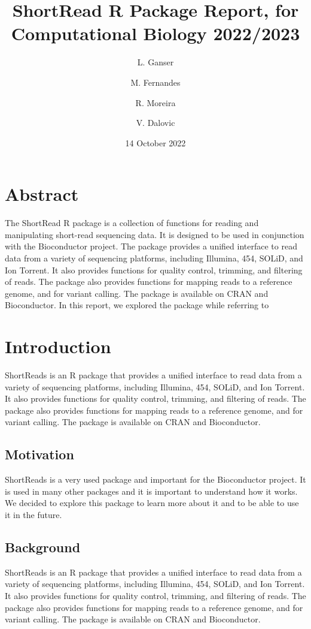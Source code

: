 \documentclass[12pt]{article}
\title{ShortRead R Package Report, for Computational Biology 2022/2023}
\date{14 October 2022}
\author[1]{L. Ganser}
\author[2]{M. Fernandes}
\author[2]{R. Moreira}
\author[2]{V. Dalovic}
\affil[1]{École Polytechnique Fédérale de Lausanne, Switzerland}
\affil[2]{Instituto Superior T\'ecnico, Universidade de Lisboa, Portugal}
\begin{document}
\maketitle


\section{Abstract} 

The ShortRead R package is a collection of functions for reading and manipulating short-read sequencing data. It is designed to be used in conjunction with the Bioconductor project. The package provides a unified interface to read data from a variety of sequencing platforms, including Illumina, 454, SOLiD, and Ion Torrent. It also provides functions for quality control, trimming, and filtering of reads. The package also provides functions for mapping reads to a reference genome, and for variant calling. The package is available on CRAN and Bioconductor.
In this report, we explored the package while referring to %

\section{Introduction}
ShortReads is an R package that provides a unified interface to read data from a variety of sequencing platforms, including 
Illumina, 454, SOLiD, and Ion Torrent. It also provides functions for quality control, trimming, and filtering of reads.
The package also provides functions for mapping reads to a reference genome, and for variant calling. The package is available on CRAN and Bioconductor.


\subsection{Motivation}
ShortReads is a very used package and important for the Bioconductor project. It is used in many other packages and it is important to understand how it works.
We decided to explore this package to learn more about it and to be able to use it in the future.

\subsection{Background}
ShortReads is an R package that provides a unified interface to read data from a variety of sequencing platforms, including Illumina, 454, SOLiD, and Ion Torrent.
It also provides functions for quality control, trimming, and filtering of reads. The package also provides functions for mapping reads to a reference genome, and for variant calling. The package is available on CRAN and Bioconductor.
\end{document}
